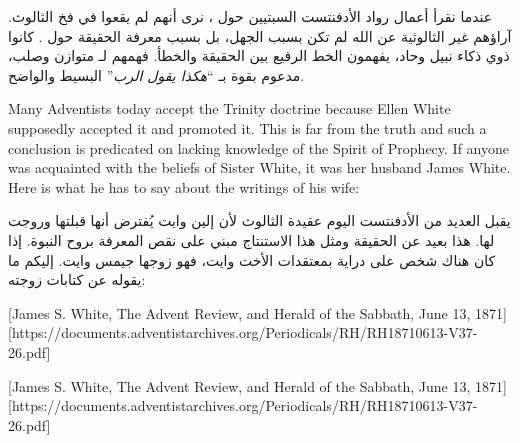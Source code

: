 عندما نقرأ أعمال رواد الأدفنتست السبتيين حول ، نرى أنهم لم يقعوا في فخ الثالوث. آراؤهم غير الثالوثية عن الله لم تكن بسبب الجهل، بل بسبب معرفة الحقيقة حول . كانوا ذوي ذكاء نبيل وحاد، يفهمون الخط الرفيع بين الحقيقة والخطأ. فهمهم لـ  متوازن وصلب، مدعوم بقوة بـ “\textit{هكذا يقول الرب}” البسيط والواضح.


Many Adventists today accept the Trinity doctrine because Ellen White supposedly accepted it and promoted it. This is far from the truth and such a conclusion is predicated on lacking knowledge of the Spirit of Prophecy. If anyone was acquainted with the beliefs of Sister White, it was her husband James White. Here is what he has to say about the writings of his wife:


يقبل العديد من الأدفنتست اليوم عقيدة الثالوث لأن إلين وايت يُفترض أنها قبلتها وروجت لها. هذا بعيد عن الحقيقة ومثل هذا الاستنتاج مبني على نقص المعرفة بروح النبوة. إذا كان هناك شخص على دراية بمعتقدات الأخت وايت، فهو زوجها جيمس وايت. إليكم ما يقوله عن كتابات زوجته:


[James S. White, The Advent Review, and Herald of the Sabbath, June 13, 1871][https://documents.adventistarchives.org/Periodicals/RH/RH18710613-V37-26.pdf]


[James S. White, The Advent Review, and Herald of the Sabbath, June 13, 1871][https://documents.adventistarchives.org/Periodicals/RH/RH18710613-V37-26.pdf]


